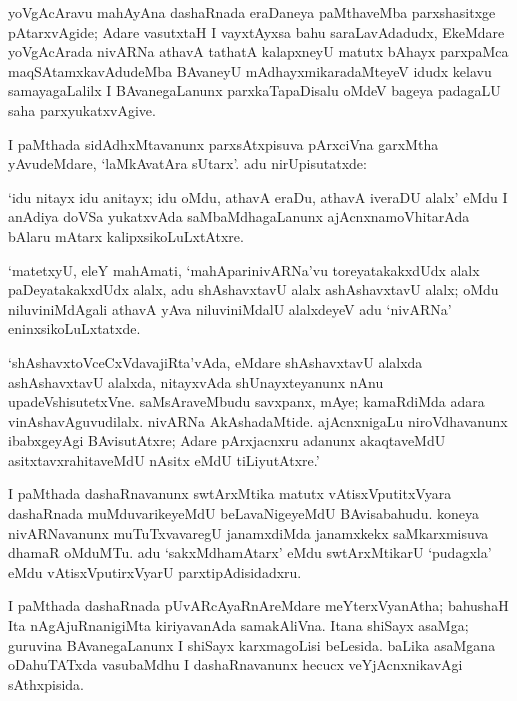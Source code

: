 yoVgAcAravu mahAyAna dashaRnada eraDaneya paMthaveMba parxshasitxge pAtarxvAgide; Adare vasutxtaH I vayxtAyxsa bahu saraLavAdadudx, EkeMdare yoVgAcArada nivARNa athavA tathatA kalapxneyU matutx bAhayx parxpaMca maqSAtamxkavAdudeMba BAvaneyU mAdhayxmikaradaMteyeV idudx kelavu samayagaLalilx I BAvanegaLanunx parxkaTapaDisalu oMdeV bageya padagaLU saha parxyukatxvAgive.

I paMthada sidAdhxMtavanunx parxsAtxpisuva pArxciVna garxMtha yAvudeMdare, `laMkAvatAra sUtarx'. adu nirUpisutatxde:

`idu nitayx idu anitayx; idu oMdu, athavA eraDu, athavA iveraDU alalx' eMdu I anAdiya doVSa yukatxvAda saMbaMdhagaLanunx ajAcnxnamoVhitarAda bAlaru mAtarx kalipxsikoLuLxtAtxre.

`matetxyU, eleY mahAmati, `mahAparinivARNa'vu toreyatakakxdUdx alalx paDeyatakakxdUdx alalx, adu shAshavxtavU alalx ashAshavxtavU alalx; oMdu niluviniMdAgali athavA yAva niluviniMdalU alalxdeyeV adu `nivARNa' eninxsikoLuLxtatxde.

`shAshavxtoVceCxVdavajiRta'vAda, eMdare shAshavxtavU alalxda ashAshavxtavU alalxda, nitayxvAda shUnayxteyanunx nAnu upadeVshisutetxVne. saMsAraveMbudu savxpanx, mAye; kamaRdiMda adara vinAshavAguvudilalx. nivARNa AkAshadaMtide. ajAcnxnigaLu niroVdhavanunx ibabxgeyAgi BAvisutAtxre; Adare pArxjacnxru adanunx akaqtaveMdU asitxtavxrahitaveMdU nAsitx eMdU tiLiyutAtxre.'

I paMthada dashaRnavanunx swtArxMtika matutx vAtisxVputitxVyara dashaRnada muMduvarikeyeMdU beLavaNigeyeMdU BAvisabahudu. koneya nivARNavanunx muTuTxvavaregU janamxdiMda janamxkekx saMkarxmisuva dhamaR oMduMTu. adu `sakxMdhamAtarx' eMdu swtArxMtikarU `pudagxla' eMdu vAtisxVputirxVyarU parxtipAdisidadxru.

I paMthada dashaRnada pUvARcAyaRnAreMdare meYterxVyanAtha; bahushaH Ita nAgAjuRnanigiMta kiriyavanAda samakAliVna. Itana shiSayx asaMga; guruvina BAvanegaLanunx I shiSayx karxmagoLisi beLesida. baLika asaMgana oDahuTATxda vasubaMdhu I dashaRnavanunx hecucx veYjAcnxnikavAgi sAthxpisida.

